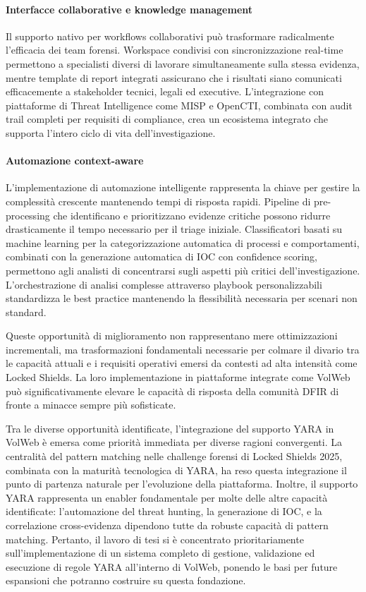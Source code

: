 \paragraph{Interfacce collaborative e knowledge management}
Il supporto nativo per workflows collaborativi può trasformare radicalmente l'efficacia dei team forensi. Workspace condivisi con sincronizzazione real-time permettono a specialisti diversi di lavorare simultaneamente sulla stessa evidenza, mentre template di report integrati assicurano che i risultati siano comunicati efficacemente a stakeholder tecnici, legali ed executive. L'integrazione con piattaforme di Threat Intelligence come MISP e OpenCTI, combinata con audit trail completi per requisiti di compliance, crea un ecosistema integrato che supporta l'intero ciclo di vita dell'investigazione.

\paragraph{Automazione context-aware}
L'implementazione di automazione intelligente rappresenta la chiave per gestire la complessità crescente mantenendo tempi di risposta rapidi. Pipeline di pre-processing che identificano e prioritizzano evidenze critiche possono ridurre drasticamente il tempo necessario per il triage iniziale. Classificatori basati su machine learning per la categorizzazione automatica di processi e comportamenti, combinati con la generazione automatica di IOC con confidence scoring, permettono agli analisti di concentrarsi sugli aspetti più critici dell'investigazione. L'orchestrazione di analisi complesse attraverso playbook personalizzabili standardizza le best practice mantenendo la flessibilità necessaria per scenari non standard.

Queste opportunità di miglioramento non rappresentano mere ottimizzazioni incrementali, ma trasformazioni fondamentali necessarie per colmare il divario tra le capacità attuali e i requisiti operativi emersi da contesti ad alta intensità come Locked Shields. La loro implementazione in piattaforme integrate come VolWeb può significativamente elevare le capacità di risposta della comunità DFIR di fronte a minacce sempre più sofisticate.

Tra le diverse opportunità identificate, l'integrazione del supporto YARA in VolWeb è emersa come priorità immediata per diverse ragioni convergenti. La centralità del pattern matching nelle challenge forensi di Locked Shields 2025, combinata con la maturità tecnologica di YARA, ha reso questa integrazione il punto di partenza naturale per l'evoluzione della piattaforma. Inoltre, il supporto YARA rappresenta un enabler fondamentale per molte delle altre capacità identificate: l'automazione del threat hunting, la generazione di IOC, e la correlazione cross-evidenza dipendono tutte da robuste capacità di pattern matching. Pertanto, il lavoro di tesi si è concentrato prioritariamente sull'implementazione di un sistema completo di gestione, validazione ed esecuzione di regole YARA all'interno di VolWeb, ponendo le basi per future espansioni che potranno costruire su questa fondazione.

